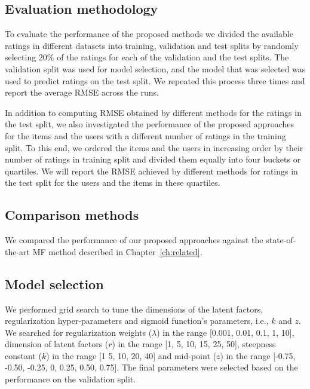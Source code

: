 \fi


\subsection{Evaluation methodology}
To evaluate the performance of the proposed methods we divided the available
ratings in different datasets into training, validation and test splits by
randomly selecting 20\% of the ratings for each of the validation and the test
splits. The validation split was used for model selection, and the model that
was selected was used to predict ratings on the test split. We repeated this
process three times and report the average RMSE across the runs.


In addition to computing RMSE obtained by different methods for the ratings in
the test split, we also investigated the performance of the proposed approaches
for the items and the users with a different number of ratings in the training
split. To this end, we ordered the items and the users in increasing order by
their number of ratings in training split and divided them equally into four
buckets or quartiles. We will report the RMSE achieved by different methods for ratings in
the test split for the users and the items in these quartiles. 

\subsection{Comparison methods}
We compared the performance of our proposed approaches against the
state-of-the-art MF method described in Chapter~\ref{ch:related}.



\subsection{Model selection}
We performed grid search to tune the dimensions of the latent factors,
regularization hyper-parameters and sigmoid function's parameters, i.e., $k$ and
$z$. We searched for regularization weights ($\lambda$) in the range [0.001,
0.01, 0.1, 1, 10], dimension of latent factors ($r$) in the range [1, 5, 10, 15,
25, 50], steepness constant ($k$) in the range [1 5, 10, 20, 40] and mid-point
($z$) in the range [-0.75, -0.50, -0.25, 0, 0.25, 0.50, 0.75]. The final parameters were selected based
on the performance on the validation split.